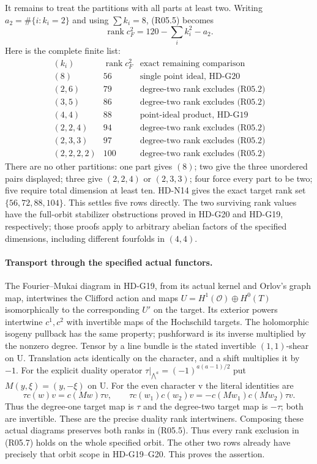 It remains to treat the partitions with all parts at least two.
Writing $a_2=\#\{i:k_i=2\}$ and using $\sum k_i=8$, (R05.5)
becomes
\[
                  \operatorname{rank}c_F^2
                          =120-\sum_i k_i^2-a_2.              \tag{R05.6}
\]
Here is the complete finite list:
\[
\begin{array}{c|r|l}
 (k_i)&\operatorname{rank}c_F^2&\text{exact remaining comparison}\\\hline
 (8)&56&\text{single point ideal, HD-G20}\\
 (2,6)&79&\text{degree-two rank excludes (R05.2)}\\
 (3,5)&86&\text{degree-two rank excludes (R05.2)}\\
 (4,4)&88&\text{point-ideal product, HD-G19}\\
 (2,2,4)&94&\text{degree-two rank excludes (R05.2)}\\
 (2,3,3)&97&\text{degree-two rank excludes (R05.2)}\\
 (2,2,2,2)&100&\text{degree-two rank excludes (R05.2)}
\end{array}                                                     \tag{R05.7}
\]
There are no other partitions: one part gives $(8)$; two give the
three unordered pairs displayed; three give $(2,2,4)$ or $(2,3,3)$;
four force every part to be two; five require total dimension at least
ten. HD-N14 gives the exact target rank set $\{56,72,88,104\}$.
This settles five rows directly. The two surviving rank values have
the full-orbit stabilizer obstructions proved in HD-G20 and HD-G19,
respectively; those proofs apply to arbitrary abelian factors of the
specified dimensions, including different fourfolds in $(4,4)$.

\paragraph{Transport through the specified actual functors.}
The Fourier--Mukai diagram in HD-G19, from its actual kernel and
Orlov's graph map, intertwines the Clifford action and maps
$U=H^1(\mathcal O)\oplus H^0(T)$ isomorphically to the corresponding
$U'$ on the target. Its exterior powers intertwine $c^1,c^2$ with
invertible maps of the Hochschild targets. The holomorphic isogeny
pullback has the same property; pushforward is its inverse multiplied
by the nonzero degree. Tensor by a line bundle is the stated
invertible $(1,1)$-shear on U. Translation acts identically on the
character, and a shift multiplies it by $-1$. For the explicit duality
operator $\tau|_{\bigwedge^a}=(-1)^{a(a-1)/2}$ put
$M(y,\xi)=(y,-\xi)$ on U. For the even character v the literal
identities are
\[
 \tau c(w)v=c(Mw)\tau v,\qquad
 \tau c(w_1)c(w_2)v=-c(Mw_1)c(Mw_2)\tau v.
                                                               \tag{R05.8}
\]
Thus the degree-one target map is $\tau$ and the degree-two target
map is $-\tau$; both are invertible. These are the precise duality
rank intertwiners. Composing these actual diagrams preserves both
ranks in (R05.5). Thus every rank exclusion in (R05.7) holds on the
whole specified orbit. The other two rows already have precisely that
orbit scope in HD-G19--G20. This proves the assertion.

